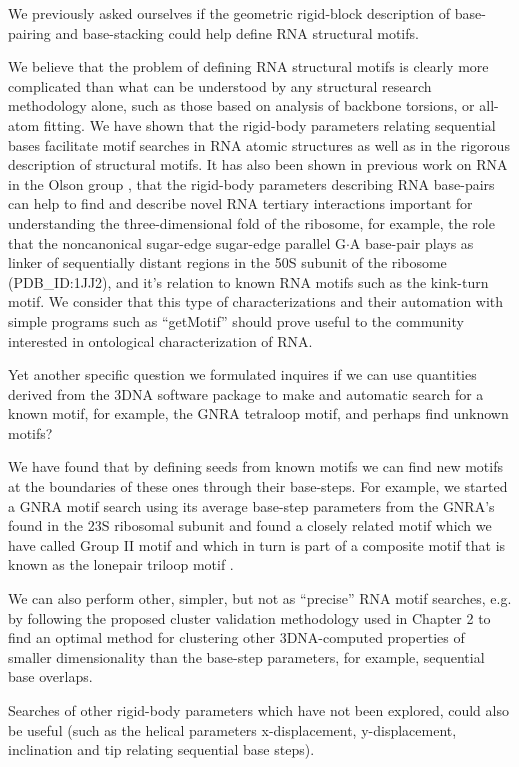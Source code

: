 We previously asked ourselves if the geometric rigid-block description
of  base-pairing and  base-stacking could  help define  RNA structural
motifs.

We  believe that  the problem  of  defining RNA  structural motifs  is
clearly more complicated than what can be understood by any structural
research  methodology  alone,  such  as  those based  on  analysis  of
backbone  torsions,  or all-atom  fitting.   We  have  shown that  the
rigid-body  parameters  relating  sequential  bases  facilitate  motif
searches  in  RNA  atomic  structures  as  well  as  in  the  rigorous
description of structural  motifs. It has also been  shown in previous
work  on  RNA  in   the  Olson  group  \cite{yurongthesis},  that  the
rigid-body parameters  describing RNA base-pairs can help  to find and
describe novel  RNA tertiary interactions  important for understanding
the three-dimensional fold of the ribosome, for example, the role that
the  noncanonical sugar-edge  sugar-edge parallel  G$\cdot$A base-pair
plays as linker of sequentially  distant regions in the 50S subunit of
the  ribosome (PDB\_ID:1JJ2), and  it's relation  to known  RNA motifs
such  as  the   kink-turn  motif.  We  consider  that   this  type  of
characterizations and  their automation  with simple programs  such as
``getMotif''  should  prove  useful  to the  community  interested  in
ontological characterization of RNA.

Yet another specific question we  formulated inquires if we can use
quantities  derived  from  the  3DNA  software  package  to  make  and
automatic search  for a known  motif, for example, the  GNRA tetraloop
motif, and perhaps find unknown motifs?

We have found that by defining seeds from known motifs we can find new
motifs at the boundaries of  these ones through their base-steps.  For
example, we  started a GNRA  motif search using its  average base-step
parameters  from the  GNRA's found  in the  23S ribosomal  subunit and
found a closely related motif which  we have called Group II motif and
which in turn is part of a composite motif \cite{nasalean2009} that is
known as the lonepair triloop motif \cite{lee2003}.

We can also  perform other, simpler, but not  as ``precise'' RNA motif
searches,   e.g.  by   following  the   proposed   cluster  validation
methodology used in Chapter 2 to find an optimal method for clustering
other  3DNA-computed  properties of  smaller  dimensionality than  the
base-step parameters, for example, sequential base overlaps.

Searches of other rigid-body  parameters which have not been explored,
could also  be useful (such as the  helical parameters x-displacement,
y-displacement, inclination and tip relating sequential base steps).



